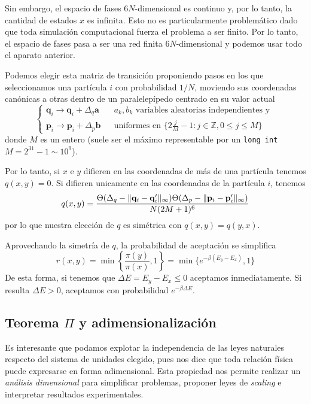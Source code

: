Sin embargo, el espacio de fases $6N$-dimensional es continuo y, por lo tanto, la cantidad de estados $x$ es infinita.
Esto no es particularmente problemático dado que toda simulación computacional fuerza el problema a ser finito.
Por lo tanto, el espacio de fases pasa a ser una red finita $6N$-dimensional y podemos usar todo el aparato anterior.

Podemos elegir esta matriz de transición proponiendo pasos en los que seleccionamos una partícula $i$ con probabilidad $1/N$, moviendo sus coordenadas canónicas a otras dentro de un paralelepípedo
centrado en su valor actual
\[
\left\{\begin{matrix}
\mathbf{q}_i \to  \mathbf{q}_i + \Delta_q \mathbf{a} & & a_k,b_k \text{ variables aleatorias independientes y }  \\
\mathbf{p}_i \to  \mathbf{p}_i + \Delta_p \mathbf{b} & &  \text{uniformes en } \{2\frac{j}{M}-1: j\in\mathbb{Z}, 0 \leq j \leq M\}
\end{matrix}\right.\]
donde $M$ es un entero (suele ser el máximo representable por un \texttt{long int} $M = 2^{31}-1\sim 10^9$).

Por lo tanto, si $x$ e $y$ difieren en las coordenadas de más de una partícula tenemos $q(x,y)=0$.
Si difieren unicamente en las coordenadas de la partícula $i$, tenemos
\[q(x,y) = \frac{\Theta(\Delta_q - \Arrowvert \mathbf{q}_i - \mathbf{q}_i' \Arrowvert_\infty)\Theta(\Delta_p - \Arrowvert \mathbf{p}_i - \mathbf{p}_i' \Arrowvert_\infty)}{N(2M+1)^6}\]
por lo que nuestra elección de $q$ es simétrica con $q(x,y) = q(y,x)$.

Aprovechando la simetría de $q$, la probabilidad de aceptación se simplifica
\[r(x,y) = \min\left\{\frac{\pi(y)}{\pi(x)}, 1\right\} = \min\{e^{-\beta(E_y-E_x)}, 1\}\]
De esta forma, si tenemos que $\Delta E = E_y - E_x \leq 0$ aceptamos inmediatamente. Si resulta $\Delta E > 0$, aceptamos con probabilidad $e^{-\beta\Delta E}$.


\subsection{Teorema $\Pi$ y adimensionalización}{\label{sec:intro_pi}}

Es interesante que podamos explotar la independencia de las leyes naturales respecto del sistema de unidades elegido, pues nos dice que toda relación física puede expresarse en forma adimensional. 
Esta propiedad nos permite realizar un \textit{análisis dimensional} para simplificar problemas, proponer leyes de \textit{scaling} e interpretar resultados experimentales.

